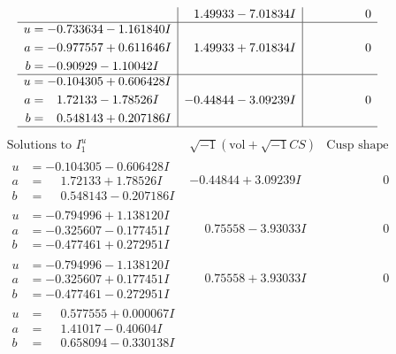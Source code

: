 \documentclass[1p]{elsarticle_modified}
\theoremstyle{definition}
\newcommand{\I}{\sqrt{-1}}
\begin{document}
$$\begin{array}{c|c|c}
 & \phantom{-}1.49933 - 7.01834 I & \phantom{-0.000000 } 0 \\ \hline\begin{aligned}
u &= -0.733634 - 1.161840 I \\
a &= -0.977557 + 0.611646 I \\
b &= -0.90929 - 1.10042 I\end{aligned}
 & \phantom{-}1.49933 + 7.01834 I & \phantom{-0.000000 } 0 \\ \hline\begin{aligned}
u &= -0.104305 + 0.606428 I \\
a &= \phantom{-}1.72133 - 1.78526 I \\
b &= \phantom{-}0.548143 + 0.207186 I\end{aligned}
 & -0.44844 - 3.09239 I & \phantom{-0.000000 } 0\\
 \hline 
 \end{array}$$\newpage$$\begin{array}{c|c|c}  
\text{Solutions to }I^u_{1}& \I (\text{vol} + \sqrt{-1}CS) & \text{Cusp shape}\\
 \hline 
\begin{aligned}
u &= -0.104305 - 0.606428 I \\
a &= \phantom{-}1.72133 + 1.78526 I \\
b &= \phantom{-}0.548143 - 0.207186 I\end{aligned}
 & -0.44844 + 3.09239 I & \phantom{-0.000000 } 0 \\ \hline\begin{aligned}
u &= -0.794996 + 1.138120 I \\
a &= -0.325607 - 0.177451 I \\
b &= -0.477461 + 0.272951 I\end{aligned}
 & \phantom{-}0.75558 - 3.93033 I & \phantom{-0.000000 } 0 \\ \hline\begin{aligned}
u &= -0.794996 - 1.138120 I \\
a &= -0.325607 + 0.177451 I \\
b &= -0.477461 - 0.272951 I\end{aligned}
 & \phantom{-}0.75558 + 3.93033 I & \phantom{-0.000000 } 0 \\ \hline\begin{aligned}
u &= \phantom{-}0.577555 + 0.000067 I \\
a &= \phantom{-}1.41017 - 0.40604 I \\
b &= \phantom{-}0.658094 - 0.330138 I\end{aligned}

\end{array}$$
\end{document}
